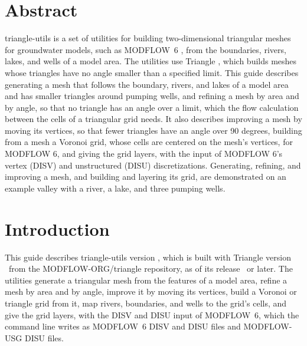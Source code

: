 \documentclass[11pt,twoside,twocolumn]{usgsreport}
\begin{document}
{\renewcommand{\coverruleoddpage}{}\renewcommand{\USGSvisidname}{blank}%
 \renewcommand{\doiagency}{}\renewcommand{\textusgs}{}%
 \ifdef{\makefrontcoveralt}{\makefrontcoveralt}{\makefrontcover}}
\ifdef{\makefrontmatterabv}{\makefrontmatterabv}{\makefrontmatter}

\onecolumn
\pagestyle{body}
\RaggedRight
\setlength{\parindent}{2em}

\section*{Abstract}

triangle-utils is a set of utilities for building two-dimensional triangular meshes for groundwater models, such as MODFLOW~6 \citep{modflow6gwf}, from the boundaries, rivers, lakes, and wells of a model area. The utilities use Triangle \citep{shewchuk1996triangle}, which builds meshes whose triangles have no angle smaller than a specified limit. This guide describes generating a mesh that follows the boundary, rivers, and lakes of a model area and has smaller triangles around pumping wells, and refining a mesh by area and by angle, so that no triangle has an angle over a limit, which the flow calculation between the cells of a triangular grid needs. It also describes improving a mesh by moving its vertices, so that fewer triangles have an angle over 90 degrees, building from a mesh a Voronoi grid, whose cells are centered on the mesh's vertices, for MODFLOW 6, and giving the grid layers, with the input of MODFLOW 6's vertex (DISV) and unstructured (DISU) discretizations. Generating, refining, and improving a mesh, and building and layering its grid, are demonstrated on an example valley with a river, a lake, and three pumping wells.

\section{Introduction}

This guide describes triangle-utils version \tuversion, which is built with Triangle version \triangleversion\ from the MODFLOW-ORG/triangle repository, as of its release \trianglerelease\ or later. The utilities generate a triangular mesh from the features of a model area, refine a mesh by area and by angle, improve it by moving its vertices, build a Voronoi or triangle grid from it, map rivers, boundaries, and wells to the grid's cells, and give the grid layers, with the DISV and DISU input of MODFLOW~6, which the command line writes as MODFLOW~6 DISV and DISU files and MODFLOW-USG DISU files.
\end{document}
